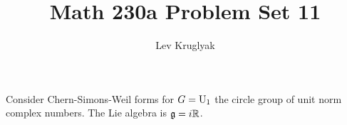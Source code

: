 \documentclass{../../templates/lkx_pset}
\title{Math 230a Problem Set 11}
\author{Lev Kruglyak}
\begin{document}
\maketitle

%
\begin{problem}{2}
Consider Chern-Simons-Weil forms for $G=\operatorname{U}_1$ the circle group of unit norm complex numbers. The Lie algebra is $\mathfrak{g}=i\mathbb{R}$.
\end{problem}
\end{document}
